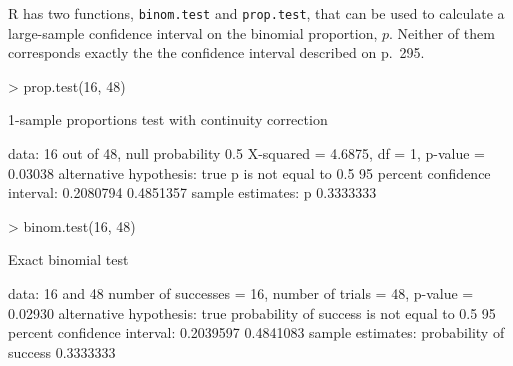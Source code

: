 \documentclass{book}
\begin{document}
R has two functions, \texttt{binom.test} and \texttt{prop.test}, that
can be used to calculate a large-sample confidence interval on the
binomial proportion, $p$.  Neither of them corresponds exactly the the
confidence interval described on p.~295.
\begin{Schunk}
\begin{Sinput}
> prop.test(16, 48)
\end{Sinput}
\begin{Soutput}
	1-sample proportions test with continuity correction

data:  16 out of 48, null probability 0.5 
X-squared = 4.6875, df = 1, p-value = 0.03038
alternative hypothesis: true p is not equal to 0.5 
95 percent confidence interval:
 0.2080794 0.4851357 
sample estimates:
        p 
0.3333333 
\end{Soutput}
\begin{Sinput}
> binom.test(16, 48)
\end{Sinput}
\begin{Soutput}
	Exact binomial test

data:  16 and 48 
number of successes = 16, number of trials = 48, p-value = 0.02930
alternative hypothesis: true probability of success is not equal to 0.5 
95 percent confidence interval:
 0.2039597 0.4841083 
sample estimates:
probability of success 
             0.3333333 
\end{Soutput}
\end{Schunk}
\end{document}
